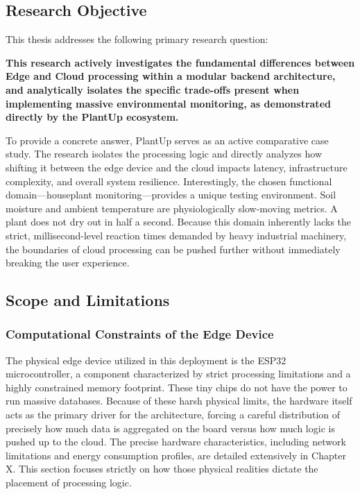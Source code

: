 \subsection{Research Objective}

This thesis addresses the following primary research question:

\textbf{This research actively investigates the fundamental differences between Edge and Cloud processing within a modular backend architecture, and analytically isolates the specific trade-offs present when implementing massive environmental monitoring, as demonstrated directly by the PlantUp ecosystem.}

To provide a concrete answer, PlantUp serves as an active comparative case study. The research isolates the processing logic and directly analyzes how shifting it between the edge device and the cloud impacts latency, infrastructure complexity, and overall system resilience. Interestingly, the chosen functional domain—houseplant monitoring—provides a unique testing environment. Soil moisture and ambient temperature are physiologically slow-moving metrics. A plant does not dry out in half a second. Because this domain inherently lacks the strict, millisecond-level reaction times demanded by heavy industrial machinery, the boundaries of cloud processing can be pushed further without immediately breaking the user experience.

\subsection{Scope and Limitations}

\subsubsection{Computational Constraints of the Edge Device}

The physical edge device utilized in this deployment is the ESP32 microcontroller, a component characterized by strict processing limitations and a highly constrained memory footprint. These tiny chips do not have the power to run massive databases. Because of these harsh physical limits, the hardware itself acts as the primary driver for the architecture, forcing a careful distribution of precisely how much data is aggregated on the board versus how much logic is pushed up to the cloud. The precise hardware characteristics, including network limitations and energy consumption profiles, are detailed extensively in Chapter X. This section focuses strictly on how those physical realities dictate the placement of processing logic.


